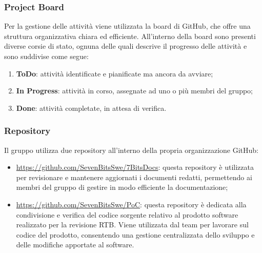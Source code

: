 \documentclass[10pt]{article}
\begin{document}
\begin{justify}
    \subsubsection{Project Board}
    Per la gestione delle attività viene utilizzata la board di GitHub, che offre una struttura organizzativa chiara ed efficiente. All'interno della board sono presenti diverse corsie di stato, ognuna delle quali descrive il progresso delle attività e sono suddivise come segue:
    \begin{enumerate}
        \item \textbf{ToDo}: attività identificate e pianificate ma ancora da avviare;
        \item \textbf{In Progress}: attività in corso, assegnate ad uno o più membri del gruppo;
        \item \textbf{Done}: attività completate, in attesa di verifica.
    \end{enumerate}

    \subsubsection{Repository}
    Il gruppo utilizza due repository all'interno della propria organizzazione GitHub:
    \begin{itemize}
        \item \href{https://github.com/SevenBitsSwe/7BitsDocs}{https://github.com/SevenBitsSwe/7BitsDocs}: questa repository è utilizzata per revisionare e mantenere aggiornati i documenti redatti, permettendo ai membri del gruppo di gestire in modo efficiente la documentazione;
        \item \href{https://github.com/SevenBitsSwe/PoC}{https://github.com/SevenBitsSwe/PoC}: questa repository è dedicata alla condivisione e verifica del codice sorgente relativo al prodotto software realizzato per la revisione RTB. Viene utilizzata dal team per lavorare sul codice del prodotto, consentendo una gestione centralizzata dello sviluppo e delle modifiche apportate al software.
    \end{itemize}


\end{justify}
\end{document}
